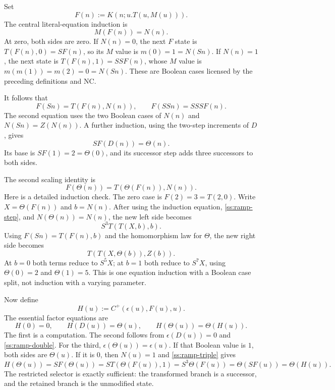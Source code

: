 \documentclass[11pt,letterpaper]{article}
\theoremstyle{definition}\newtheorem{definition}[theorem]{Definition}
\theoremstyle{remark}\newtheorem{remark}[theorem]{Remark}
\begin{document}
Set
\[
 F(n):=K(n;u.T(u,M(u))).
\]
The central literal-equation induction is
\begin{equation}
                          M(F(n))=N(n).
 \label{ss:ramp-invariant}
\end{equation}
At zero, both sides are zero.  If $N(n)=0$, the next $F$ state is
$T(F(n),0)=SF(n)$, so its $M$ value is $m(0)=1=N(Sn)$.
If $N(n)=1$, the next state is $T(F(n),1)=SSF(n)$, whose $M$ value
is $m(m(1))=m(2)=0=N(Sn)$.  These are Boolean cases licensed by
the preceding definitions and NC.

It follows that
\begin{equation}
 F(Sn)=T(F(n),N(n)),\qquad F(SSn)=SSSF(n).
 \label{ss:ramp-step}
\end{equation}
The second equation uses the two Boolean cases of $N(n)$ and
$N(Sn)=Z(N(n))$.  A further induction, using the two-step increments
of $D$, gives
\begin{equation}
                          S F(D(n))=\Theta(n).
 \label{ss:ramp-double}
\end{equation}
Its base is $S F(1)=2=\Theta(0)$, and its successor step adds three
successors to both sides.

The second scaling identity is
\begin{equation}
 F(\Theta(n))=T(\Theta(F(n)),N(n)).
 \label{ss:ramp-triple}
\end{equation}
Here is a detailed induction check.  The zero case is $F(2)=3=T(2,0)$.
Write $X=\Theta(F(n))$ and $b=N(n)$.  After using the induction
equation, \eqref{ss:ramp-step}, and
$N(\Theta(n))=N(n)$, the new left side becomes
\[
                      S^3T(T(X,b),b).
\]
Using $F(Sn)=T(F(n),b)$ and the homomorphism law for $\Theta$, the
new right side becomes
\[
                    T(T(X,\Theta(b)),Z(b)).
\]
At $b=0$ both terms reduce to $S^5X$; at $b=1$ both reduce to $S^7X$,
using $\Theta(0)=2$ and $\Theta(1)=5$.  This is one equation induction
with a Boolean case split, not induction with a varying parameter.

Now define
\[
                   H(u):=C^+(\epsilon(u),F(u),u).
\]
The essential factor equations are
\begin{equation}
 H(0)=0,\qquad H(D(u))=\Theta(u),\qquad
 H(\Theta(u))=\Theta(H(u)).
 \label{ss:factor-map}
\end{equation}
The first is a computation.  The second follows from
$\epsilon(D(u))=0$ and \eqref{ss:ramp-double}.
For the third, $\epsilon(\Theta(u))=\epsilon(u)$.
If that Boolean value is $1$, both sides are $\Theta(u)$.
If it is $0$, then $N(u)=1$ and \eqref{ss:ramp-triple} gives
\[
 H(\Theta(u))=S F(\Theta(u))
   =S T(\Theta(F(u)),1)
   =S^3\Theta(F(u))
   =\Theta(SF(u))=\Theta(H(u)).
\]
The restricted selector is exactly sufficient: the transformed branch
is a successor, and the retained branch is the unmodified state.
\end{document}
